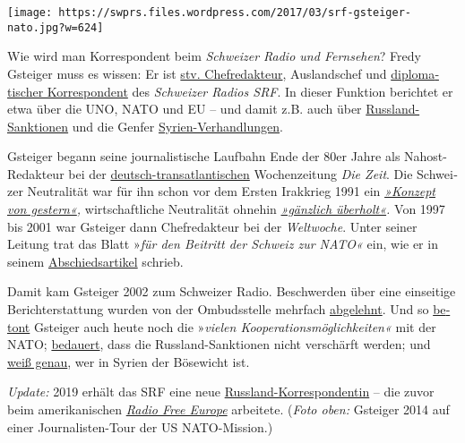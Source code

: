 \texttt{[image: https://swprs.files.wordpress.com/2017/03/srf-gsteiger-nato.jpg?w=624]}

Wie wird man Kor­res­pon­dent beim \emph{Schwei­zer Radio und
Fern­sehen}? Fredy Gsteiger muss es wissen: Er ist
\href{http://www.persoenlich.com/medien/fredy-gsteiger-neu-in-der-radio-chefredaktion-232921}{stv.
Chef­redakteur}, Auslands­chef und
\href{http://www.srf.ch/radio-srf-1/radio-srf-1/fredy-gsteiger-unser-mann-in-der-uno}{diplo­ma­tischer
Korres­pon­dent} des \emph{Schwei­zer Radios SRF}. In dieser Funktion
be­richtet er etwa über die UNO, NATO und EU -- und damit z.B. auch über
\href{http://www.srf.ch/news/international/dieser-eu-rueckzieher-ist-peinlich}{Russ­land-Sanktionen}
und die Genfer
\href{http://www.srf.ch/news/international/assad-kommt-mit-giftgaseinsaetzen-vorlaeufig-davon}{Syrien-Ver­hand­lungen}.

Gsteiger begann seine journa­lis­tische Lauf­bahn Ende der 80er Jahre
als Nahost-Redakteur bei der
\href{https://swprs.org/netzwerk-medien-deutschland/}{deutsch-trans­atlan­tischen}
Wochen­zeitung \emph{Die Zeit}. Die Schwei­zer Neutra­lität war für ihn
schon vor dem Ersten Irak­krieg 1991 ein
\emph{\href{http://www.zeit.de/1990/44/ein-konzept-von-gestern}{»Konzept
von gestern«},} wirt­schaft­liche Neutralität ohnehin
\emph{\href{http://www.zeit.de/1990/44/ein-konzept-von-gestern}{»gänz­lich
über­holt«}.} Von 1997 bis 2001 war Gsteiger dann Chef­redakteur bei der
\emph{Welt­woche}. Unter seiner Leitung trat das Blatt »\emph{für den
Bei­tritt der Schweiz zur NATO«} ein, wie er in seinem
\href{https://web.archive.org/web/20040722094101/http://www.weltwoche.ch/artikel/?AssetID=400\&CategoryID=60}{Abschieds­artikel}
schrieb.

Damit kam Gsteiger 2002 zum Schweizer Radio. Be­schwer­den über eine
ein­sei­tige Be­richt­er­stattung wurden von der Ombuds­stelle mehr­fach
\href{https://www.srgd.ch/de/aktuelles/news/2016/09/28/sendung-info-3-auf-radio-srf-3-uber-waffenruhe-syrien-beanstandet/}{abge­lehnt}.
Und so
\href{http://www.swissinfo.ch/ger/kooperation_die-nato-umwirbt-die-schweiz/42225918}{be­tont}
Gsteiger auch heute noch die »\emph{vielen
Koope­ra­tions­möglich­keiten«} mit der NATO;
\href{http://www.srf.ch/news/international/dieser-eu-rueckzieher-ist-peinlich}{be­dauert},
dass die Russ­land-Sanktionen nicht ver­schärft werden; und
\href{http://www.srf.ch/news/international/assad-kommt-mit-giftgaseinsaetzen-vorlaeufig-davon}{weiß
genau}, wer in Syrien der Böse­wicht ist.

\emph{Update:} 2019 erhält das SRF eine neue
\href{https://www.srgd.ch/de/aktuelles/news/2017/12/05/luzia-tschirky-wird-neue-russland-korrespondentin/}{Russland-Korrespondentin}
-- die zuvor beim amerikanischen
\href{https://de.wikipedia.org/wiki/Radio_Free_Europe}{\emph{Radio Free
Europe}} arbeitete. (\emph{Foto oben:} Gsteiger 2014 auf einer
Jour­na­­listen-​Tour der US NATO-Mission.)

